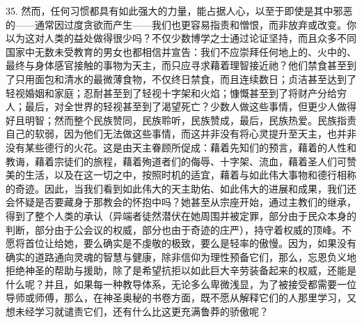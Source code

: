 35. 然而，任何习惯都具有如此强大的力量，能占据人心，以至于即使是其中邪恶的——通常因过度贪欲而产生——我们也更容易指责和憎恨，而非放弃或改变。你以为这对人类的益处做得很少吗？不仅少数博学之士通过论证坚持，而且众多不同国家中无数未受教育的男女也都相信并宣告：我们不应崇拜任何地上的、火中的、最终与身体感官接触的事物为天主，而只应寻求藉着理智接近祂？他们禁食甚至到了只用面包和清水的最微薄食物，不仅终日禁食，而且连续数日；贞洁甚至达到了轻视婚姻和家庭；忍耐甚至到了轻视十字架和火焰；慷慨甚至到了将财产分给穷人；最后，对全世界的轻视甚至到了渴望死亡？少数人做这些事情，但更少人做得好且明智；然而整个民族赞同，民族聆听，民族赞成，最后，民族热爱。民族指责自己的软弱，因为他们无法做这些事情，而这并非没有将心灵提升至天主，也并非没有某些德行的火花。这是由天主眷顾所促成：藉着先知们的预言，藉着的人性和教诲，藉着宗徒们的旅程，藉着殉道者们的侮辱、十字架、流血，藉着圣人们可赞美的生活，以及在这一切之中，按照时机的适宜，藉着与如此伟大事物和德行相称的奇迹。因此，当我们看到如此伟大的天主助佑、如此伟大的进展和成果，我们还会怀疑是否要藏身于那教会的怀抱中吗？她甚至从宗座开始，通过主教们的继承，得到了整个人类的承认（异端者徒然潜伏在她周围并被定罪，部分由于民众本身的判断，部分由于公会议的权威，部分也由于奇迹的庄严），持守着权威的顶峰。不愿将首位让给她，要么确实是不虔敬的极致，要么是轻率的傲慢。因为，如果没有确实的道路通向灵魂的智慧与健康，除非信仰为理性预备它们，那么，忘恩负义地拒绝神圣的帮助与援助，除了是希望抗拒以如此巨大辛劳装备起来的权威，还能是什么呢？并且，如果每一种教导体系，无论多么卑微浅显，为了被接受都需要一位导师或师傅，那么，在神圣奥秘的书卷方面，既不愿从解释它们的人那里学习，又想未经学习就谴责它们，还有什么比这更充满鲁莽的骄傲呢？\par

